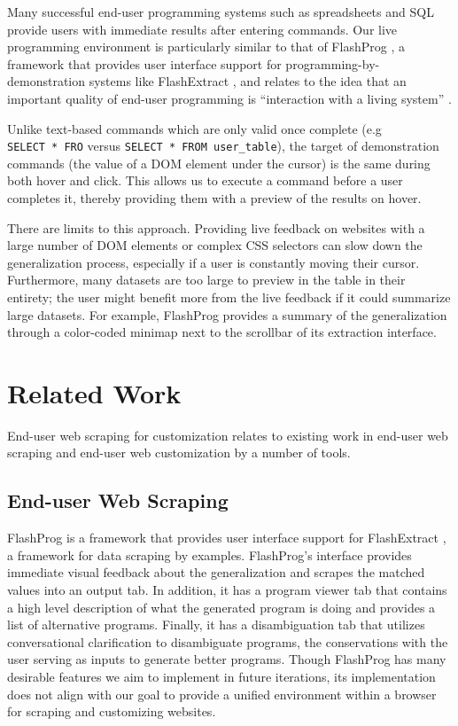 \documentclass[sigconf,10pt]{acmart}
\begin{document}
Many successful end-user programming systems such as spreadsheets and
SQL provide users with immediate results after entering commands. Our
live programming environment is particularly similar to that of
FlashProg \citep{mayer2015}, a framework that provides user interface
support for programming-by-demonstration systems like FlashExtract
\citep{le2014}, and relates to the idea that an important quality of
end-user programming is ``interaction with a living system''
\citep{zotero-1362}.

Unlike text-based commands which are only valid once complete (e.g
\texttt{SELECT\ *\ FRO} versus \texttt{SELECT\ *\ FROM\ user\_table}),
the target of demonstration commands (the value of a DOM element under
the cursor) is the same during both hover and click. This allows us to
execute a command before a user completes it, thereby providing them
with a preview of the results on hover.

There are limits to this approach. Providing live feedback on websites
with a large number of DOM elements or complex CSS selectors can slow
down the generalization process, especially if a user is constantly
moving their cursor. Furthermore, many datasets are too large to preview
in the table in their entirety; the user might benefit more from the
live feedback if it could summarize large datasets. For example,
FlashProg provides a summary of the generalization through a color-coded
minimap next to the scrollbar of its extraction interface.

\hypertarget{sec:related-work}{%
\section{Related Work}\label{sec:related-work}}

End-user web scraping for customization relates to existing work in
end-user web scraping and end-user web customization by a number of
tools.

\hypertarget{end-user-web-scraping}{%
\subsection{End-user Web Scraping}\label{end-user-web-scraping}}

FlashProg \citep{mayer2015} is a framework that provides user interface
support for FlashExtract \citep{le2014}, a framework for data scraping
by examples. FlashProg's interface provides immediate visual feedback
about the generalization and scrapes the matched values into an output
tab. In addition, it has a program viewer tab that contains a high level
description of what the generated program is doing and provides a list
of alternative programs. Finally, it has a disambiguation tab that
utilizes conversational clarification to disambiguate programs, the
conservations with the user serving as inputs to generate better
programs. Though FlashProg has many desirable features we aim to
implement in future iterations, its implementation does not align with
our goal to provide a unified environment within a browser for scraping
and customizing websites.
\end{document}
